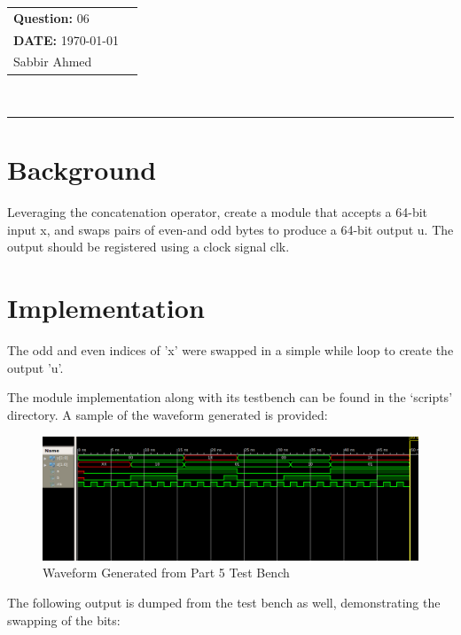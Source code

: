 \documentclass[paper=usletter, fontsize=12pt]{article}
\newcommand{\documentinfo}[3]{
    \begin{centering}
        \parbox{2in}{
        \begin{spacing}{1}
            \begin{flushleft}
                \begin{tabular}{l l}
                    #1 \\
                    #2 \\
                    #3 \\
                \end{tabular}\\
                \rule{\textwidth}{1pt}
            \end{flushleft}
        \end{spacing}
        }
    \end{centering}
}
\begin{document}
    \documentinfo{\textbf{Question:} 06}{\textbf{DATE:} \today}{Sabbir Ahmed}
    \vspace{-0.1in}

    \section{Background}
    Leveraging the concatenation operator, create a module that accepts a 64-bit input x, and swaps pairs of even-and odd bytes to produce a 64-bit output u. The output should be registered using a clock signal clk.

    \section{Implementation}
    The odd and even indices of 'x' were swapped in a simple while loop to create the output 'u'.

    The module implementation along with its testbench can be found in the `scripts' directory. A sample of the waveform generated is provided:

    \begin{figure}[ht]
        \begin{center}
            \includegraphics[width=1\textwidth]{wav.png}
            \caption{Waveform Generated from Part 5 Test Bench} \label{fig:wav}
        \end{center}
    \end{figure}

    The following output is dumped from the test bench as well, demonstrating the swapping of the bits:
\end{document}
